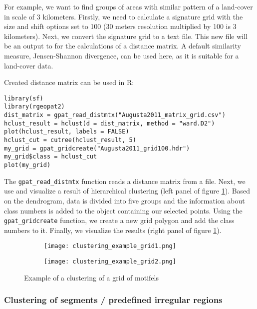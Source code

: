 For example, we want to find groups of areas with similar pattern of a land-cover in scale of 3 kilometers.
Firstly, we need to calculate a signature grid with the size and shift options set to 100 (30 meters resolution multiplied by 100 is 3 kilometers).
Next, we convert the signature grid to a text file.
This new file will be an output to for the calculations of a distance matrix.
A default similarity measure, Jensen-Shannon divergence, can be used here, as it is suitable for a land-cover data.

Created distance matrix can be used in R:

\begin{minipage}{\linewidth}
\begin{lstlisting}
library(sf)
library(rgeopat2)
dist_matrix = gpat_read_distmtx("Augusta2011_matrix_grid.csv")
hclust_result = hclust(d = dist_matrix, method = "ward.D2")
plot(hclust_result, labels = FALSE)
hclust_cut = cutree(hclust_result, 5)
my_grid = gpat_gridcreate("Augusta2011_grid100.hdr")
my_grid$class = hclust_cut
plot(my_grid)
\end{lstlisting}
\end{minipage}

The {\tt gpat\_read\_distmtx} function reads a distance matrix from a file. 
Next, we use and visualize a result of hierarchical clustering (left panel of figure \ref{FIG:CLUSTER_GRID2}).
Based on the dendrogram, data is divided into five groups and the information about class numbers is added to the object containing our selected points.
Using the {\tt gpat\_gridcreate} function, we create a new grid polygon and add the class numbers to it.
Finally, we visualize the results (right panel of figure \ref{FIG:CLUSTER_GRID2}).

\begin{figure}[H]
  \begin{subfigure}[b]{0.5\textwidth}
    \texttt{[image: clustering\_example\_grid1.png]}
  \end{subfigure}
  \begin{subfigure}[b]{0.5\textwidth}
    \texttt{[image: clustering\_example\_grid2.png]}
  \end{subfigure}
  \caption{Example of a clustering of a grid of motifels}
  \label{FIG:CLUSTER_GRID2}
\end{figure}

\FloatBarrier

\subsubsection{Clustering of segments / predefined irregular regions}

